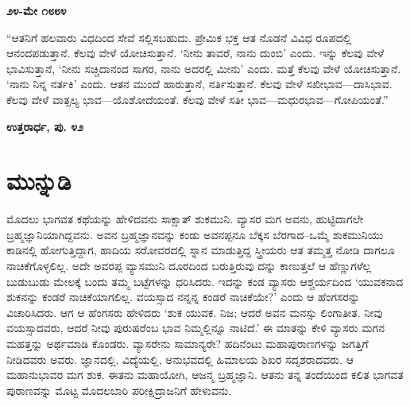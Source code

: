 \begin{flushright}
\textbf{೨೪-ಮೇ ೧೮೮೪}
\end{flushright}

“ಆತನಿಗೆ ಹಲವಾರು ವಿಧದಿಂದ ಸೇವೆ ಸಲ್ಲಿಸಬಹುದು. ಪ್ರೇಮಿಕ ಭಕ್ತ ಆತ ನೊಡನೆ ವಿವಿಧ ರೂಪದಲ್ಲಿ ಆನಂದಪಡುತ್ತಾನೆ. ಕೆಲವು ವೇಳೆ ಯೋಚಿಸುತ್ತಾನೆ. ‘ನೀನು ತಾವರೆ, ನಾನು ದುಂಬಿ’ ಎಂದು. ಇನ್ನು ಕೆಲವು ವೇಳೆ ಭಾವಿಸುತ್ತಾನೆ, ‘ನೀನು ಸಚ್ಚಿದಾನಂದ ಸಾಗರ, ನಾನು ಅದರಲ್ಲಿ ಮೀನು’ ಎಂದು. ಮತ್ತೆ ಕೆಲವು ವೇಳೆ ಯೋಚಿಸುತ್ತಾನೆ. ‘ನಾನು ನಿನ್ನ ನರ್ತಕಿ’ ಎಂದು. ಆತನ ಮುಂದೆ ಹಾರುತ್ತಾನೆ, ನರ್ತಿಸುತ್ತಾನೆ. ಕೆಲವು ವೇಳೆ ಸಖೀಭಾವ—ದಾಸಿಭಾವ. ಕೆಲವು ವೇಳೆ ವಾತ್ಸಲ್ಯ ಭಾವ—ಯೊಶೋದೆಯಂತೆ. ಕೆಲವು ವೇಳೆ ಸತೀ ಭಾವ—ಮಧುರಭಾವ—ಗೋಪಿಯಂತೆ.”

\begin{flushright}
\textbf{ಉತ್ತರಾರ್ಧ, ಪು. ೪೨}
\end{flushright}

\chapter*{ಮುನ್ನುಡಿ}

ಮೊದಲು ಭಾಗವತ ಕಥೆಯನ್ನು ಹೇಳಿದವನು ಸಾಕ್ಷಾತ್ ಶುಕಮುನಿ. ವ್ಯಾಸರ ಮಗ ಅವನು, ಹುಟ್ಟಿದಾಗಲೇ ಬ್ರಹ್ಮಜ್ಞಾನಿಯಾಗಿದ್ದವನು. ಅವನ ಬ್ರಹ್ಮಜ್ಞಾನವನ್ನು ಕಂಡು ಅವನಪ್ಪನೂ ಬೆಕ್ಕಸ ಬೆರಗಾದ–ಒಮ್ಮೆ ಶುಕಮುನಿಯು ಕಾಡಿನಲ್ಲಿ ಹೋಗುತ್ತಿದ್ದಾಗ, ಹಾದಿಯ ಸರೋವರದಲ್ಲಿ ಸ್ನಾನ ಮಾಡುತ್ತಿದ್ದ ಸ್ತ್ರೀಯರು ಆತ ತಮ್ಮತ್ತ ನೋಡಿ ದಾಗಲೂ ನಾಚಿಕೆಗೊಳ್ಳಲಿಲ್ಲ. ಅದೇ ಅವರಪ್ಪ ವ್ಯಾಸಮುನಿ ದೂರದಿಂದ ಬರುತ್ತಿರುವು ದನ್ನು ಕಾಣುತ್ತಲೆ ಆ ಹೆಣ್ಣುಗಳೆಲ್ಲ ಬುಡುಬುಡು ಮೇಲಕ್ಕೆ ಬಂದು ತಮ್ಮ ಬಟ್ಟೆಗಳನ್ನು ಧರಿಸಿದರು. ಇದನ್ನು ಕಂಡ ವ್ಯಾಸರು ಆಶ್ಚರ್ಯದಿಂದ ‘ಯುವಕನಾದ ಶುಕನನ್ನು ಕಂಡರೆ ನಾಚಿಕೆಯಾಗಲಿಲ್ಲ. ವಯಸ್ಸಾದ ನನ್ನನ್ನ ಕಂಡರೆ ನಾಚಿಕೆಯೇ?’ ಎಂದು ಆ ಹೆಂಗಸರನ್ನು ವಿಚಾರಿಸಿದರು. ಆಗ ಆ ಹೆಂಗಸರು ಹೇಳಿದರು ‘ಶುಕ ಯುವಕ. ನಿಜ; ಆದರೆ ಅವನ ಮನಸ್ಸು ಲಿಂಗಾತೀತ. ನೀವು ವಯಸ್ಸಾದವರು, ಆದರೆ ನೀವು ಪುರುಷರೆಂಬ ಭಾವ ನಿಮ್ಮಲ್ಲಿನ್ನೂ ನಾಟಿದೆ.’ ಈ ಮಾತನ್ನು ಕೇಳಿ ವ್ಯಾಸರು ಮಗನ ಮಹತ್ತನ್ನು ಅರ್ಥಮಾಡಿ ಕೊಂಡರು. ವ್ಯಾಸರೇನು ಸಾಮಾನ್ಯರೇ? ಹದಿನೆಂಟು ಮಹಾಪುರಾಣಗಳನ್ನು ಜಗತ್ತಿಗೆ ನೀಡಿದವರು ಅವರು. ಜ್ಞಾನದಲ್ಲಿ, ವಿದ್ಯೆಯಲ್ಲಿ, ಅನುಭವದಲ್ಲಿ ಹಿಮಾಲಯ ಶಿಖರ ಸದೃಶರಾದವರು. ಆ ಮಹಾನುಭಾವರ ಮಗ ಶುಕ. ಈತನು ಮಹಾಯೋಗಿ, ಆಜನ್ಮ ಬ್ರಹ್ಮಜ್ಞಾನಿ. ಆತನು ತನ್ನ ತಂದೆಯಿಂದ ಕಲಿತ ಭಾಗವತ ಪುರಾಣವನ್ನು ಮೊಟ್ಟ ಮೊದಲಬಾರಿ ಪರೀಕ್ಷಿದ್ರಾಜನಿಗೆ ಹೇಳುವನು.

